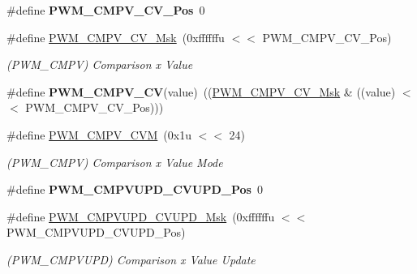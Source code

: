 \begin{DoxyCompactItemize}
\#define {\bfseries P\+W\+M\+\_\+\+C\+M\+P\+V\+\_\+\+C\+V\+\_\+\+Pos}~0
\item 
\mbox{\label{group__SAMS70__PWM_ga6f836e7af802c562b6c84db59f333e93}} 
\#define \mbox{\hyperlink{group__SAMS70__PWM_ga6f836e7af802c562b6c84db59f333e93}{P\+W\+M\+\_\+\+C\+M\+P\+V\+\_\+\+C\+V\+\_\+\+Msk}}~(0xffffffu $<$$<$ P\+W\+M\+\_\+\+C\+M\+P\+V\+\_\+\+C\+V\+\_\+\+Pos)
\begin{DoxyCompactList}\small\item\em (P\+W\+M\+\_\+\+C\+M\+PV) Comparison x Value \end{DoxyCompactList}\item 
\mbox{\label{group__SAMS70__PWM_ga91c785b8594eae01c0c8b1c52b823f36}} 
\#define {\bfseries P\+W\+M\+\_\+\+C\+M\+P\+V\+\_\+\+CV}(value)~((\mbox{\hyperlink{group__SAMV71__PWM_ga6f836e7af802c562b6c84db59f333e93}{P\+W\+M\+\_\+\+C\+M\+P\+V\+\_\+\+C\+V\+\_\+\+Msk}} \& ((value) $<$$<$ P\+W\+M\+\_\+\+C\+M\+P\+V\+\_\+\+C\+V\+\_\+\+Pos)))
\item 
\mbox{\label{group__SAMS70__PWM_ga24cfa2d6b73b73550360250af30a5224}} 
\#define \mbox{\hyperlink{group__SAMS70__PWM_ga24cfa2d6b73b73550360250af30a5224}{P\+W\+M\+\_\+\+C\+M\+P\+V\+\_\+\+C\+VM}}~(0x1u $<$$<$ 24)
\begin{DoxyCompactList}\small\item\em (P\+W\+M\+\_\+\+C\+M\+PV) Comparison x Value Mode \end{DoxyCompactList}\item 
\mbox{\label{group__SAMS70__PWM_ga00d9ce6aa5ce448194cfda50721bd5b0}} 
\#define {\bfseries P\+W\+M\+\_\+\+C\+M\+P\+V\+U\+P\+D\+\_\+\+C\+V\+U\+P\+D\+\_\+\+Pos}~0
\item 
\mbox{\label{group__SAMS70__PWM_ga814522233f8137b734c794b115c82d08}} 
\#define \mbox{\hyperlink{group__SAMS70__PWM_ga814522233f8137b734c794b115c82d08}{P\+W\+M\+\_\+\+C\+M\+P\+V\+U\+P\+D\+\_\+\+C\+V\+U\+P\+D\+\_\+\+Msk}}~(0xffffffu $<$$<$ P\+W\+M\+\_\+\+C\+M\+P\+V\+U\+P\+D\+\_\+\+C\+V\+U\+P\+D\+\_\+\+Pos)
\begin{DoxyCompactList}\small\item\em (P\+W\+M\+\_\+\+C\+M\+P\+V\+U\+PD) Comparison x Value Update \end{DoxyCompactList}\item 

\end{DoxyCompactItemize}
